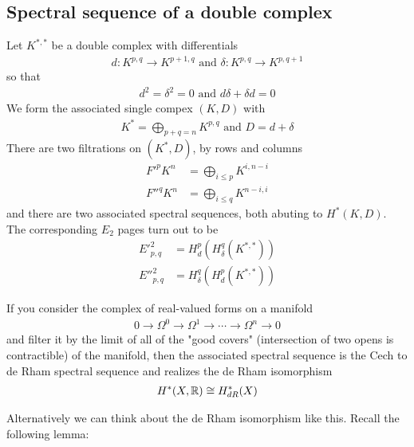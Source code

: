 \subsection{Spectral sequence of a double complex}
Let $K^{*,*}$ be a double complex with differentials \begin{align*}
    d: K^{p,q} \to K^{p+1,q} \text{ and } \delta: K^{p,q} \to K^{p,q+1}
\end{align*} so that \begin{align*}
    d^2 = \delta^2 = 0 \text{ and } d\delta + \delta d = 0
\end{align*} We form the associated single compex $(K,D)$ with \begin{align*}
    K^* = \bigoplus_{p+q=n} K^{p,q} \text{ and } D = d + \delta
\end{align*}
There are two filtrations on $(K^*,D)$, by rows and columns \begin{align*}
    F'^pK^n &= \bigoplus_{i\leq p} K^{i,n-i} \\
    F''^qK^n &= \bigoplus_{i\leq q} K^{n-i,i}
\end{align*} and there are two associated spectral sequences, both abuting to 
$H^*(K,D)$. The corresponding $E_2$ pages turn out to be \begin{align*}
    E'^2_{p,q} &= H^p_d(H^q_\delta(K^{*,*})) \\
    E''^2_{p,q} &= H^q_\delta(H^p_d(K^{*,*}))
\end{align*}
\begin{example}
    If you consider the complex of real-valued forms on a manifold \begin{align*}
        0 \to \Omega^0 \to \Omega^1 \to \cdots \to \Omega^n \to 0
    \end{align*} and filter it by the limit of all of the "good covers" (intersection 
    of two opens is contractible) of the manifold, 
    then the associated spectral sequence is the Cech to de Rham spectral sequence and
    realizes the de Rham isomorphism \begin{align*}
        H^*(X,\mathbb{R}) \cong H^*_{dR}(X)
    \end{align*}
\end{example}
Alternatively we can think about the de Rham isomorphism like this. Recall the 
following lemma:

